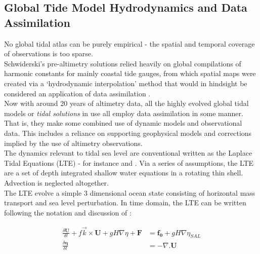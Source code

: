 \subsection{Global Tide Model Hydrodynamics and Data Assimilation}

No global tidal atlas can be purely empirical - the spatial and temporal coverage of observations is too sparse.\\
Schwiderski's pre-altimetry solutions relied heavily on global compilations of harmonic constants for mainly coastal tide gauges, from which spatial maps were created via a `hydrodynamic interpolation' method that would in hindsight be considered an application of data assimilation \cite[pp822]{Egbert:1994wz}.\\
Now with around 20 years of altimetry data, all the highly evolved global tidal models or \emph{tidal solutions} in use all employ data assimilation in some manner.  That is, they make some combined use of dynamic models and observational data.  This includes a reliance on supporting geophysical models and corrections implied by the use of altimetry observations.\\



The dynamics relevant to tidal sea level are conventional written as the Laplace Tidal Equations (LTE) - for instance \cite[9.8]{gill1982atmosphere} and \cite{Hendershott:1981ub}.   
Via a series of assumptions, the LTE are a set of depth integrated shallow water equations in a rotating thin shell.  Advection is neglected altogether.\\
The LTE evolve a simple 3 dimensional ocean state consisting of horizontal mass transport and sea level perturbation. In time domain, the LTE can be written following the notation and discussion of \cite[pp185]{Egbert:2002ug}:

\begin{align}
\label{E:LTE_momtm}
\frac{\delta \mathbf{U} }{ \delta t} + f\vec{k} \times \mathbf{U} + gH\nabla \eta  + \mathbf{F} &= \mathbf{f_0} + gH \nabla \eta_{SAL} \\
\label{E:LTE_cont}
\frac{\delta \mathbf{\eta} }{\delta t} &= -\nabla.\mathbf{U} 
\end{align}

